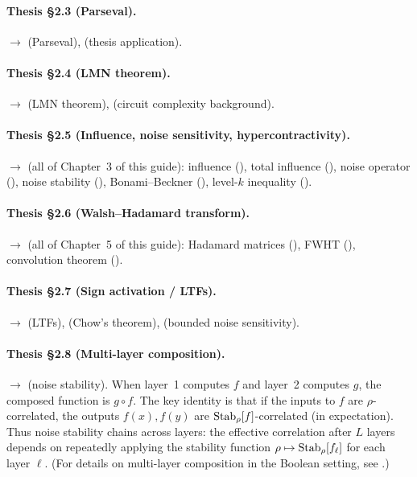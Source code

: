 \paragraph{Thesis \S2.3 (Parseval).}
$\to$  (Parseval), 
(thesis application).

\paragraph{Thesis \S2.4 (LMN theorem).}
$\to$  (LMN theorem), 
(circuit complexity background).

\paragraph{Thesis \S2.5 (Influence, noise sensitivity, hypercontractivity).}
$\to$  (all of Chapter~3 of this guide):
influence (),
total influence (),
noise operator (),
noise stability (),
Bonami--Beckner (),
level-$k$ inequality ().

\paragraph{Thesis \S2.6 (Walsh--Hadamard transform).}
$\to$  (all of Chapter~5 of this guide):
Hadamard matrices (),
FWHT (),
convolution theorem ().

\paragraph{Thesis \S2.7 (Sign activation / LTFs).}
$\to$  (LTFs),  (Chow's theorem),
 (bounded noise sensitivity).

\paragraph{Thesis \S2.8 (Multi-layer composition).}
$\to$  (noise stability).
When layer~1 computes $f$ and layer~2 computes $g$, the composed
function is $g \circ f$. The key identity is that if the inputs to $f$
are $\rho$-correlated, the outputs $f(x), f(y)$ are
$\operatorname{Stab}_\rho[f]$-correlated (in expectation). Thus noise stability
chains across layers: the effective correlation after $L$ layers depends
on repeatedly applying the stability function $\rho \mapsto \operatorname{Stab}_\rho[f_\ell]$
for each layer $\ell$.
(For details on multi-layer composition in the Boolean setting, see
\citealp[\S2.4 and Chapter~11]{odonnell2014analysis}.)

